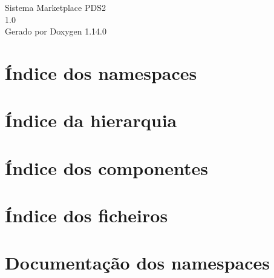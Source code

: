 \documentclass[twoside]{book}
\newcommand{\+}{\discretionary{\mbox{\scriptsize$\hookleftarrow$}}{}{}}
\newcommand{\clearemptydoublepage}{%
    \newpage{\pagestyle{empty}\cleardoublepage}%
  }
\begin{document}
  \raggedbottom
    \hypersetup{pageanchor=false,
                bookmarksnumbered=true,
                pdfencoding=unicode
               }
  \begin{titlepage}
  \vspace*{7cm}
  \begin{center}%
  {\Large Sistema Marketplace PDS2}\\
  [1ex]\large 1.\+0 \\
  \vspace*{1cm}
  {\large Gerado por Doxygen 1.14.0}\\
  \end{center}
  \end{titlepage}
  \clearemptydoublepage
  \tableofcontents
  \clearemptydoublepage
  \hypersetup{pageanchor=true}

\chapter{Índice dos namespaces}

\chapter{Índice da hierarquia}

\chapter{Índice dos componentes}

\chapter{Índice dos ficheiros}

\chapter{Documentação dos namespaces}










\end{document}
